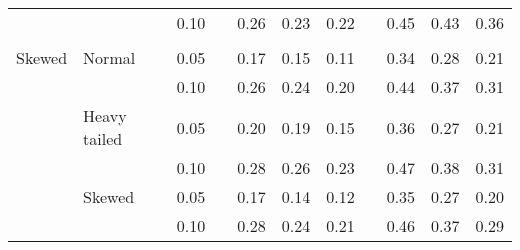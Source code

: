 \begin{table}[ht]
\begin{scriptsize}
\begin{center}
\begin{tabular}{ll p{.1cm} c p{.1cm} rrr p{.1cm} rrr}
             &              && 0.10 &&  0.26 & 0.23 & 0.22 && 0.45 & 0.43 & 0.36 \\ 
             &&&&&&&&&&&\\
Skewed       & Normal       && 0.05 &&  0.17 & 0.15 & 0.11 && 0.34 & 0.28 & 0.21 \\ 
             &              && 0.10 &&  0.26 & 0.24 & 0.20 && 0.44 & 0.37 & 0.31 \\ 
             & Heavy tailed && 0.05 &&  0.20 & 0.19 & 0.15 && 0.36 & 0.27 & 0.21 \\ 
             &              && 0.10 &&  0.28 & 0.26 & 0.23 && 0.47 & 0.38 & 0.31 \\ 
             & Skewed       && 0.05 &&  0.17 & 0.14 & 0.12 && 0.35 & 0.27 & 0.20 \\ 
             &              && 0.10 &&  0.28 & 0.24 & 0.21 && 0.46 & 0.37 & 0.29 \\

\hline
\end{tabular}
\end{center}
\end{scriptsize}
\end{table}


